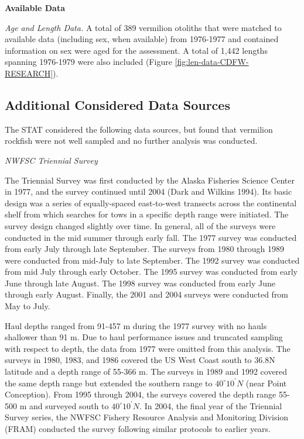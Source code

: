 \documentclass[
  english,
  a4paper,
]{article}
\begin{document}
\textbf{Available Data}

\emph{Age and Length Data.}
A total of 389 vermilion otoliths that were matched to available
data (including sex, when available) from 1976-1977 and contained information on
sex were aged for the assessment.
A total of 1,442 lengths spanning 1976-1979 were also included (Figure
\ref{fig:len-data-CDFW-RESEARCH}).

\hypertarget{additional-considered-data-sources}{%
\subsection{Additional Considered Data Sources}\label{additional-considered-data-sources}}

The STAT considered the following data sources, but found that vermilion rockfish were
not well sampled and no further analysis was conducted.

\emph{NWFSC Triennial Survey}

The Triennial Survey was first conducted by the Alaska Fisheries Science Center in 1977, and the survey
continued until 2004 (Dark and Wilkins 1994).
Its basic design was a series of equally-spaced east-to-west transects across
the continental shelf from which searches for tows in a specific depth range were initiated.
The survey design changed slightly over time.
In general, all of the surveys were conducted in the mid summer through early fall.
The 1977 survey was conducted from early July through late September.
The surveys from 1980 through 1989 were conducted from mid-July to late September.
The 1992 survey was conducted from mid July through early October.
The 1995 survey was conducted from early June through late August.
The 1998 survey was conducted from early June through early August.
Finally, the 2001 and 2004 surveys were conducted from May to July.

Haul depths ranged from 91-457 m during the 1977 survey with no hauls shallower
than 91 m.
Due to haul performance issues and truncated sampling with respect to depth, the
data from 1977 were omitted from this analysis.
The surveys in 1980, 1983, and 1986 covered the US West Coast south to
36.8\textdegree N latitude and a depth range of 55-366 m.
The surveys in 1989 and 1992 covered the same depth range but extended the
southern range to $40^\circ 10^\prime N$ (near Point Conception).
From 1995 through 2004, the surveys covered the depth range 55-500 m and
surveyed south to $40^\circ 10^\prime N$.
In 2004, the final year of the Triennial Survey series, the NWFSC Fishery
Resource Analysis and Monitoring Division (FRAM) conducted the survey following
similar protocols to earlier years.
\end{document}

